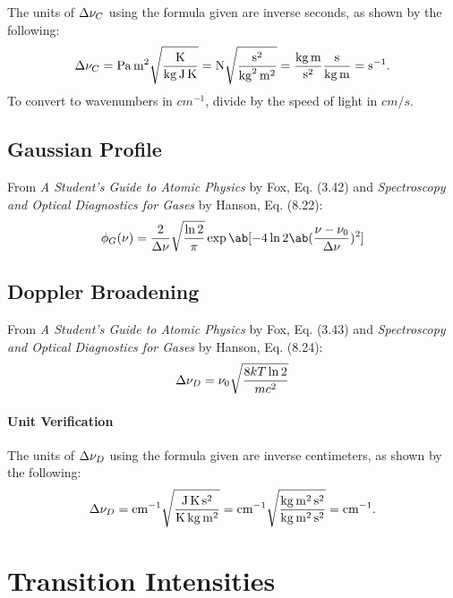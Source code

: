 \documentclass[11pt, twoside, fleqn]{report}
\begin{document}
The units of $\adif{\nu}_{C}$ using the formula given are inverse seconds, as shown by the following:
\begin{equation*}
    \adif{\nu}_{C} = \unit{Pa.m^{2}}\sqrt{\frac{\unit{K}}{\unit{kg.J.K}}} = \unit{N}\sqrt{\frac{\unit{s^{2}}}{\unit{kg^{2}.m^{2}}}} = \frac{\unit{kg.m}}{\unit{s^{2}}}\frac{\unit{s}}{\unit{kg.m}} = \unit{s^{-1}}.
\end{equation*}
To convert to wavenumbers in $\unit{cm^{-1}}$, divide by the speed of light in $\unit{cm/s}$.

\subsection{Gaussian Profile}

From \textit{A Student's Guide to Atomic Physics} by Fox, Eq. (3.42) and \textit{Spectroscopy and Optical Diagnostics for Gases} by Hanson, Eq. (8.22):
\begin{equation*}
    \phi_{G}(\nu) = \frac{2}{\adif{\nu}}\sqrt{\frac{\ln{2}}{\pi}}\exp\ab[-4\ln{2}\ab(\frac{\nu - \nu_{0}}{\adif{\nu}})^{2}]
\end{equation*}

\subsection{Doppler Broadening}

From \textit{A Student's Guide to Atomic Physics} by Fox, Eq. (3.43) and \textit{Spectroscopy and Optical Diagnostics for Gases} by Hanson, Eq. (8.24):
\begin{equation*}
    \adif{\nu}_{D} = \nu_{0}\sqrt{\frac{8kT\ln{2}}{mc^{2}}}
\end{equation*}

\paragraph{Unit Verification}

The units of $\adif{\nu}_{D}$ using the formula given are inverse centimeters, as shown by the following:
\begin{equation*}
    \adif{\nu}_{D} = \unit{cm^{-1}}\sqrt{\frac{\unit{J.K.s^{2}}}{\unit{K.kg.m^{2}}}} = \unit{cm^{-1}}\sqrt{\frac{\unit{kg.m^{2}.s^{2}}}{\unit{kg.m^{2}.s^{2}}}} = \unit{cm^{-1}}.
\end{equation*}

\section{Transition Intensities}
\end{document}
